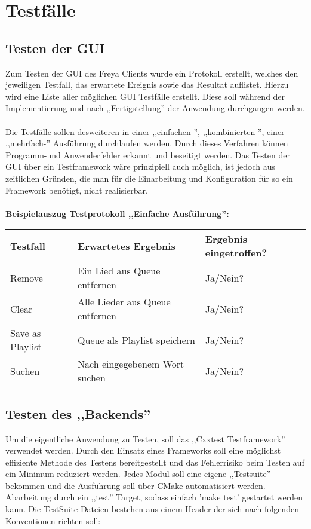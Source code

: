 \newpage
\section{Testfälle}

\subsection{Testen der GUI}
Zum Testen der GUI des Freya Clients wurde ein Protokoll erstellt, welches den
jeweiligen Testfall, das erwartete Ereignis sowie das Resultat auflistet. Hierzu wird
eine Liste aller möglichen GUI Testfälle erstellt. Diese soll während der Implementierung 
und nach ,,Fertigstellung'' der Anwendung durchgangen werden.
\\
\\
Die Testfälle sollen desweiteren in einer ,,einfachen-'', ,,kombinierten-'', einer ,,mehrfach-''
Ausführung durchlaufen werden.
Durch dieses Verfahren können Programm-und Anwenderfehler erkannt und beseitigt werden.
Das Testen der GUI über ein Testframework wäre prinzipiell auch möglich, ist jedoch aus zeitlichen
Gründen, die man für die Einarbeitung und Konfiguration für so ein Framework benötigt, nicht realisierbar.
\\
\\
\textbf{Beispielauszug Testprotokoll ,,Einfache Ausführung'':}
\\
\begin{tabularx}{\textwidth}{|X|X|l|}
    \hline
    \textbf{Testfall} & \textbf{Erwartetes Ergebnis} & \textbf{Ergebnis eingetroffen?}\\
    \hline
    Remove & Ein Lied aus Queue entfernen & Ja/Nein?\\
    \hline
    Clear & Alle Lieder aus Queue entfernen & Ja/Nein?\\
    \hline
    Save as Playlist & Queue als Playlist speichern & Ja/Nein?\\
    \hline
    Suchen & Nach eingegebenem Wort suchen & Ja/Nein?\\
    \hline
\end{tabularx}


\subsection{Testen des ,,Backends''}

Um die eigentliche Anwendung zu Testen, soll das ,,Cxxtest Testframework''
verwendet werden. Durch den Einsatz eines Frameworks soll eine möglichst effiziente Methode des Testens bereitgestellt
und das Fehlerrisiko beim Testen auf ein Minimum reduziert werden. Jedes Modul soll eine eigene ,,Testsuite'' bekommen und die
Ausführung soll über CMake automatisiert werden. Abarbeitung durch ein ,,test'' Target, sodass einfach 'make test' gestartet werden kann.
Die TestSuite Dateien bestehen aus einem Header der sich nach folgenden Konventionen richten soll: 

